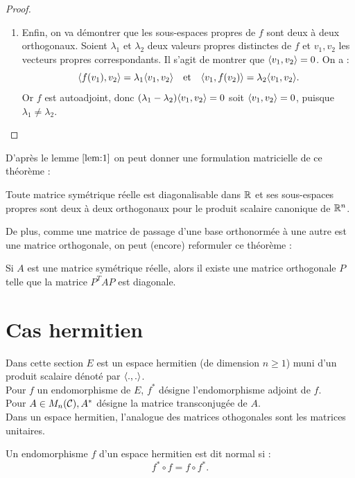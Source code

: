 \begin{proof}
\begin{enumerate}[label=(\alph*)]
\item
Enfin, on va démontrer que les sous-espaces propres de $f$ sont deux à deux orthogonaux. 
Soient $\lambda_1$ et $\lambda_2$ deux valeurs propres distinctes de $f$ et $v_1, v_2$ les vecteurs propres correspondants.
Il s'agit de montrer que $\langle v_1, v_2\rangle = 0$. On a :
\[ \langle f(v_1), v_2\rangle = \lambda_1 \langle v_1, v_2\rangle \quad \text{et} \quad \langle v_1, f(v_2)\rangle = \lambda_2 \langle v_1, v_2\rangle . \]
Or $f$ est autoadjoint, donc $(\lambda_1 - \lambda_2) \langle v_1 , v_2\rangle = 0$ 
soit $\langle v_1 , v_2\rangle = 0$, puisque $\lambda_1 \neq \lambda_2$.

\end{enumerate}
\end{proof}

D'après le lemme $\ref{lem:1}$ on peut donner une formulation matricielle de ce théorème :

\begin{thm}
Toute matrice symétrique réelle est diagonalisable dans $\mathbb{R}$ et ses sous-espaces propres sont deux à deux orthogonaux pour le 
produit scalaire canonique de $\mathbb{R}^n$.
\end{thm}

De plus, comme une matrice de passage d'une base orthonormée à une autre est une matrice orthogonale, on peut (encore) 
reformuler ce théorème :

\begin{thm}
Si $A$ est une matrice symétrique réelle, alors il existe une matrice orthogonale $P$ telle que la matrice $P^T A P$ est diagonale.
\end{thm}

\section{Cas hermitien}

\begin{nota}
Dans cette section $E$ est un espace hermitien (de dimension $n \geq 1$) muni d'un produit scalaire dénoté par $\langle.,.\rangle$. \\
Pour $f$ un endomorphisme de $E$, $f^{\ast}$ désigne l'endomorphisme adjoint de $f$. \\
Pour $A \in M_n(\mathcal{C}), A^{\ast}$ désigne la matrice transconjugée de $A$. \\
Dans un espace hermitien, l'analogue des matrices othogonales sont les matrices unitaires.
\end{nota}

\begin{defn}
Un endomorphisme $f$ d'un espace hermitien est dit normal si :
\[ f^{\ast} \circ f = f \circ f^{\ast} . \]
\end{defn}


